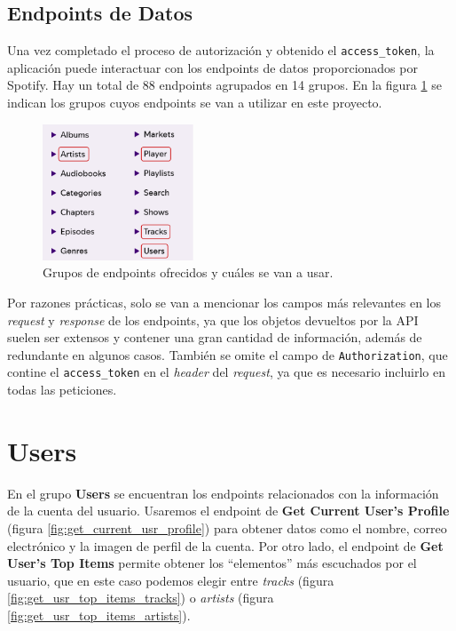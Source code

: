 \subsection{Endpoints de Datos}

Una vez completado el proceso de autorización y obtenido el \texttt{access\_token}, la aplicación puede interactuar con los endpoints de datos proporcionados por Spotify. Hay un total de 88 endpoints agrupados en 14 grupos. En la figura \ref{fig:selected_groups} se indican los grupos cuyos endpoints se van a utilizar en este proyecto.

\begin{figure}[H]
    \centering
    \includegraphics[width=0.4\textwidth]{figures/selected_groups.png}
    \caption{Grupos de endpoints ofrecidos y cuáles se van a usar.}
    \label{fig:selected_groups}
\end{figure}

Por razones prácticas, solo se van a mencionar los campos más relevantes en los \textit{request} y \textit{response} de los endpoints, ya que los objetos devueltos por la API suelen ser extensos y contener una gran cantidad de información, además de redundante en algunos casos. También se omite el campo de \texttt{Authorization}, que contine el \texttt{access\_token} en el \textit{header} del \textit{request}, ya que es necesario incluirlo en todas las peticiones.

\section*{Users}

En el grupo \textbf{Users} se encuentran los endpoints relacionados con la información de la cuenta del usuario. Usaremos el endpoint de \textbf{Get Current User's Profile} (figura \ref{fig:get_current_usr_profile}) para obtener datos como el nombre, correo electrónico y la imagen de perfil de la cuenta. Por otro lado, el endpoint de \textbf{Get User's Top Items} permite obtener los ``elementos'' más escuchados por el usuario, que en este caso podemos elegir entre \textit{tracks} (figura \ref{fig:get_usr_top_items_tracks}) o \textit{artists} (figura \ref{fig:get_usr_top_items_artists}).

